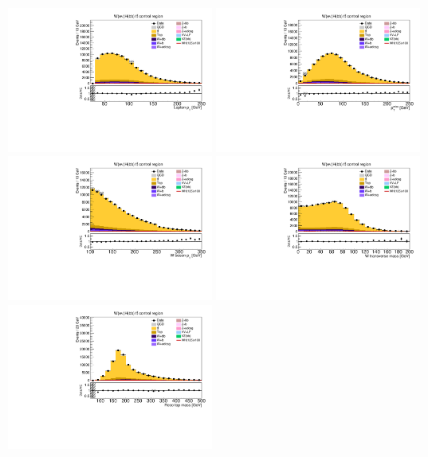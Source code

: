 \begin{figure}[tbp]
  \begin{center}
    \includegraphics[width=0.48\textwidth]{figures/wlnhbb2016/resolved/WenWH2TopCR_lepton1Pt.pdf}
    \includegraphics[width=0.48\textwidth]{figures/wlnhbb2016/resolved/WenWH2TopCR_pfmet.pdf}
    \includegraphics[width=0.48\textwidth]{figures/wlnhbb2016/resolved/WenWH2TopCR_WpT.pdf}
    \includegraphics[width=0.48\textwidth]{figures/wlnhbb2016/resolved/WenWH2TopCR_mTW.pdf}
    \includegraphics[width=0.48\textwidth]{figures/wlnhbb2016/resolved/WenWH2TopCR_topMassLep1Met.pdf}

\end{center}
\end{figure}
